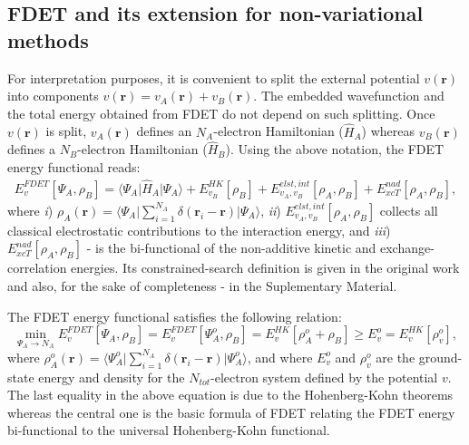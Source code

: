 \documentclass[amsmath,amssymb,preprint,aip,jcp]{revtex4-1}
\begin{document}
\subsection{FDET and its extension for non-variational methods}
For interpretation purposes, it is convenient to split the external potential $v(\mathbf{r})$ into components $v(\mathbf{r})=v_{A}(\mathbf{r})+v_{B}(\mathbf{r})$. 
The embedded wavefunction and the total energy obtained from FDET do not depend on such splitting. 
Once $v(\mathbf{r})$ is split, $v_{A}(\mathbf{r})$ defines an $N_A$-electron Hamiltonian ($\hat{H}_A$) whereas 
$v_{B}(\mathbf{r})$ defines a $N_B$-electron Hamiltonian ($\hat{H}_B$). 
Using the above notation, the FDET energy functional reads: 
\begin{eqnarray} 
\label{eq:E_FDET_v'}
{E}_{v}^{FDET}[\Psi_{A},\rho_B] = \langle\Psi_{A}\vert \hat{H}_A\vert \Psi_{A}\rangle + E^{HK}_{v_B}[\rho_B] + E^{elst,int}_{v_A,v_B}[\rho_A,\rho_B] + E_{xcT}^{nad}[\rho_A,\rho_B], 
\end{eqnarray}
where {\it i}) $\rho_A(\mathbf{r})=\langle\Psi_A\vert\sum_{i=1}^{N_{A}}\delta(\mathbf{r}_i-\mathbf{r})\vert\Psi_A\rangle$,
{\it ii}) $E^{elst,int}_{v_A,v_B}[\rho_A,\rho_B]$ collects all classical electrostatic contributions to the interaction energy, and 
{\it iii}) $E_{xcT}^{nad}[\rho_A,\rho_B]$ - is the bi-functional of the non-additive kinetic and exchange-correlation energies. {\color{red} Its constrained-search definition is given in the original work \cite{Wesolowski2008} and also, for the sake of completeness - in the Suplementary Material}. 

The FDET energy functional satisfies the following relation:
\begin{equation}\label{eq:nfund}
\min_{\Psi_A\rightarrow N_A} E_{v}^{FDET}[\Psi_{A},\rho_B] = E_{v}^{FDET}[\Psi^{o}_{A},\rho_B] = E_{v}^{HK}[\rho_A^{o}+\rho_B] \ge E_{v}^o=E_v^{HK}[\rho_v^o],
\end{equation}
where $\rho_A^{{o}}(\mathbf{r})=\langle\Psi_A^{{o}}\vert\sum_{i=1}^{N_{A}}\delta(\mathbf{r}_i-\mathbf{r})\vert\Psi_A^{{o}}\rangle$,
{\color{red}and where $E_{v}^o$  and $\rho_v^o$ are the ground-state energy and density for the $N_{tot}$-electron system defined by the potential $v$. The last equality in the above equation is due to the Hohenberg-Kohn theorems whereas the central one is the basic formula of FDET relating the FDET energy bi-functional to the universal Hohenberg-Kohn functional.}
\end{document}
